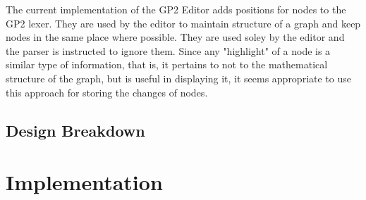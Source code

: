 \documentclass{UoYCSproject}
\begin{document}
The current implementation of the GP2 Editor adds positions for nodes to the GP2 lexer. They are used by the editor to maintain structure of a graph and keep nodes in the same place where possible. They are used soley by the editor and the parser is instructed to ignore them. Since any "highlight" of a node is a similar type of information, that is, it pertains to not to the mathematical structure of the graph, but is useful in displaying it, it seems appropriate to use this approach for storing the changes of nodes.

\section{Design Breakdown}




 
\chapter{Implementation}

\end{document}
